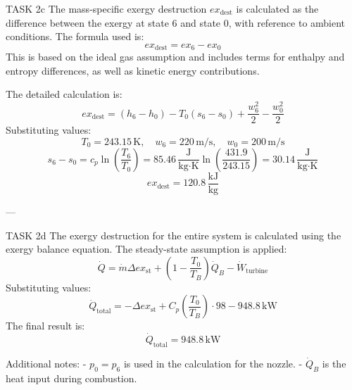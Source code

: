 TASK 2c  
The mass-specific exergy destruction \( ex_{\text{dest}} \) is calculated as the difference between the exergy at state 6 and state 0, with reference to ambient conditions. The formula used is:  
\[
ex_{\text{dest}} = ex_{6} - ex_{0}
\]  
This is based on the ideal gas assumption and includes terms for enthalpy and entropy differences, as well as kinetic energy contributions.  

The detailed calculation is:  
\[
ex_{\text{dest}} = (h_6 - h_0) - T_0 (s_6 - s_0) + \frac{w_6^2}{2} - \frac{w_0^2}{2}
\]  
Substituting values:  
\[
T_0 = 243.15 \, \text{K}, \quad w_6 = 220 \, \text{m/s}, \quad w_0 = 200 \, \text{m/s}
\]  
\[
s_6 - s_0 = c_p \ln\left(\frac{T_6}{T_0}\right) = 85.46 \, \frac{\text{J}}{\text{kg·K}} \ln\left(\frac{431.9}{243.15}\right) = 30.14 \, \frac{\text{J}}{\text{kg·K}}
\]  
\[
ex_{\text{dest}} = 120.8 \, \frac{\text{kJ}}{\text{kg}}
\]  

---

TASK 2d  
The exergy destruction for the entire system is calculated using the exergy balance equation. The steady-state assumption is applied:  
\[
\dot{Q} = \dot{m} \Delta ex_{\text{st}} + \left(1 - \frac{T_0}{T_B}\right) \dot{Q}_B - \dot{W}_{\text{turbine}}
\]  
Substituting values:  
\[
\dot{Q}_{\text{total}} = -\Delta ex_{\text{st}} + C_p \left(\frac{T_0}{T_B}\right) \cdot 98 - 948.8 \, \text{kW}
\]  
The final result is:  
\[
\dot{Q}_{\text{total}} = 948.8 \, \text{kW}
\]  

Additional notes:  
- \( p_0 = p_6 \) is used in the calculation for the nozzle.  
- \( \dot{Q}_B \) is the heat input during combustion.  
